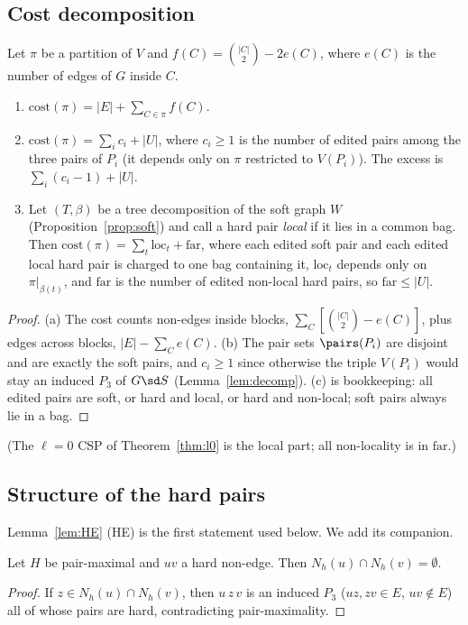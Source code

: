 \subsection{Cost decomposition}
\begin{lemma}\label{lem:CP}
Let $\pi$ be a partition of $V$ and $f(C)=\binom{|C|}2-2e(C)$, where $e(C)$ is the number of edges of $G$ inside $C$.
\begin{enumerate}
\item[(a)] $\mathrm{cost}(\pi)=|E|+\sum_{C\in\pi}f(C)$.
\item[(b)] $\mathrm{cost}(\pi)=\sum_i c_i+|U|$, where $c_i\ge1$ is the number of edited pairs among the three pairs of $P_i$ (it depends only on $\pi$ restricted to $V(P_i)$). The excess is $\sum_i(c_i-1)+|U|$.
\item[(c)] Let $(T,\beta)$ be a tree decomposition of the soft graph $W$ (Proposition~\ref{prop:soft}) and call a hard pair \emph{local} if it lies in a common bag. Then $\mathrm{cost}(\pi)=\sum_{t}\mathrm{loc}_t+\mathrm{far}$, where each edited soft pair and each edited local hard pair is charged to one bag containing it, $\mathrm{loc}_t$ depends only on $\pi|_{\beta(t)}$, and $\mathrm{far}$ is the number of edited non-local hard pairs, so $\mathrm{far}\le|U|$.
\end{enumerate}
\end{lemma}
\begin{proof}
(a) The cost counts non-edges inside blocks, $\sum_C[\binom{|C|}2-e(C)]$, plus edges across blocks, $|E|-\sum_Ce(C)$. (b) The pair sets $\pairs(P_i)$ are disjoint and are exactly the soft pairs, and $c_i\ge1$ since otherwise the triple $V(P_i)$ would stay an induced $P_3$ of $G\sd S$ (Lemma~\ref{lem:decomp}). (c) is bookkeeping: all edited pairs are soft, or hard and local, or hard and non-local; soft pairs always lie in a bag.
\end{proof}
(The $\ell=0$ CSP of Theorem~\ref{thm:l0} is the local part; all non-locality is in $\mathrm{far}$.)

\subsection{Structure of the hard pairs}
Lemma~\ref{lem:HE} (HE) is the first statement used below. We add its companion.
\begin{lemma}[H2]\label{lem:H2}
Let $H$ be pair-maximal and $uv$ a hard non-edge. Then $N_h(u)\cap N_h(v)=\emptyset$.
\end{lemma}
\begin{proof}
If $z\in N_h(u)\cap N_h(v)$, then $u\,z\,v$ is an induced $P_3$ ($uz,zv\in E$, $uv\notin E$) all of whose pairs are hard, contradicting pair-maximality.
\end{proof}

